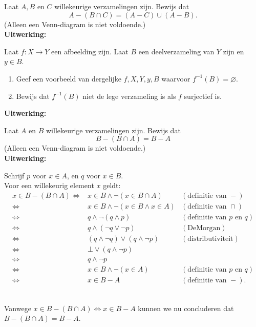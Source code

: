 \begin{answer}
Laat $A, B$ en $C$ willekeurige verzamelingen zijn. Bewijs dat
$$A-(B\cap C)=(A-C)\cup(A-B).$$
(Alleen een Venn-diagram is niet voldoende.)\\[2.5pt]

\noindent\textbf{Uitwerking:}\todo
\end{answer}

\begin{answer}
Laat $f:X\rightarrow Y$ een afbeelding zijn. Laat $B$ een deelverzameling van $Y$ zijn en $y\in B$.
\begin{enumerate}[label=\alph*.]
    \item Geef een voorbeeld van dergelijke $f, X, Y, y, B$ waarvoor $f^{-1}(B)=\varnothing$.
    \item Bewijs dat $f^{-1}(B)$ niet de lege verzameling is als $f$ surjectief is.
\end{enumerate}

\noindent\textbf{Uitwerking:}\todo
\end{answer}

\begin{answer}
Laat $A$ en $B$ willekeurige verzamelingen zijn. Bewijs dat
$$B-(B\cap A)=B-A$$
(Alleen een Venn-diagram is niet voldoende.)\\[2.5pt]

\noindent\textbf{Uitwerking:}\\
\indent\begin{minipage}{0.9\textwidth}
Schrijf $p$ voor $x\in A$, en $q$ voor $x\in B$.\\[1.5pt]
Voor een willekeurig element $x$ geldt:
$$\begin{array}{rll}
     x\in B-(B\cap A)\Leftrightarrow & x\in B\wedge\neg(x\in B\cap A)&(\text{definitie van }-)\\
     \Leftrightarrow & x\in B\wedge\neg(x\in B\wedge x\in A)&(\text{definitie van }\cap)\\
     \Leftrightarrow & q\wedge\neg(q\wedge p) & (\text{definitie van $p$ en $q$})\\
     \Leftrightarrow & q\wedge(\neg q\vee \neg p) & (\text{DeMorgan})\\
     \Leftrightarrow & (q\wedge\neg q)\vee(q\wedge\neg p) & (\text{distributiviteit})\\
     \Leftrightarrow & \bot\vee(q\wedge\neg p) &\\
     \Leftrightarrow & q\wedge\neg p & \\
     \Leftrightarrow & x\in B\wedge\neg(x\in A) & (\text{definitie van $p$ en $q$})\\
     \Leftrightarrow & x\in B-A & (\text{definitie van }-).
\end{array}$$
\end{minipage}\\
Vanwege $x\in B-(B\cap A)\Leftrightarrow x\in B-A$ kunnen we nu concluderen dat $B-(B\cap A)=B-A$.
\end{answer}

